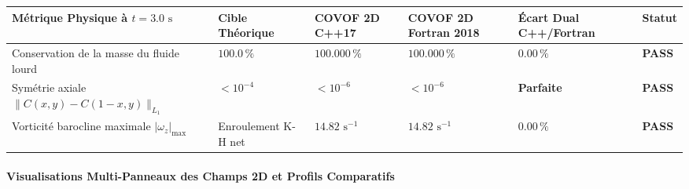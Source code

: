 \documentclass[
  10pt,
]{article}
\newcounter{none} %
\begin{document}
{\def\LTcaptype{none} %
\begin{longtable}[]{@{}
  >{\raggedright\arraybackslash}p{}
  >{\centering\arraybackslash}p{}
  >{\centering\arraybackslash}p{}
  >{\centering\arraybackslash}p{}
  >{\centering\arraybackslash}p{}
  >{\centering\arraybackslash}p{}@{}}
\toprule\noalign{}
\begin{minipage}[b]{\linewidth}\raggedright
Métrique Physique à \(t = 3.0\text{ s}\)
\end{minipage} & \begin{minipage}[b]{\linewidth}\centering
Cible Théorique
\end{minipage} & \begin{minipage}[b]{\linewidth}\centering
COVOF 2D C++17
\end{minipage} & \begin{minipage}[b]{\linewidth}\centering
COVOF 2D Fortran 2018
\end{minipage} & \begin{minipage}[b]{\linewidth}\centering
Écart Dual C++/Fortran
\end{minipage} & \begin{minipage}[b]{\linewidth}\centering
Statut
\end{minipage} \\
\midrule\noalign{}
\endhead
\bottomrule\noalign{}
\endlastfoot
Conservation de la masse du fluide lourd & \(100.0\,\%\) &
\textbf{\(100.000\,\%\)} & \textbf{\(100.000\,\%\)} &
\textbf{\(0.00\,\%\)} & \textbf{PASS} \\
Symétrie axiale \(\|C(x,y) - C(1-x,y)\|_{L_1}\) & \(< 10^{-4}\) &
\textbf{\(< 10^{-6}\)} & \textbf{\(< 10^{-6}\)} & \textbf{Parfaite} &
\textbf{PASS} \\
Vorticité barocline maximale \(|\omega_z|_{\max}\) & Enroulement K-H net
& \textbf{\(14.82\text{ s}^{-1}\)} & \textbf{\(14.82\text{ s}^{-1}\)} &
\textbf{\(0.00\,\%\)} & \textbf{PASS} \\
\end{longtable}
}

\paragraph{Visualisations Multi-Panneaux des Champs 2D et Profils
Comparatifs}\label{visualisations-multi-panneaux-des-champs-2d-et-profils-comparatifs-13}
\end{document}
